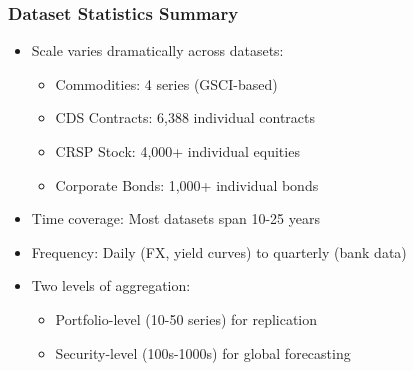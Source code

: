 \documentclass[ignorenonframetext, 9pt]{beamer}
\begin{document}
\begin{frame}
  \frametitle{Dataset Statistics Summary}
  \label{slide:dataset_stats}
\small
\begin{itemize}
\item \alert{Scale varies dramatically across datasets:}
\begin{itemize}
  \item Commodities: 4 series (GSCI-based)
  \item CDS Contracts: 6,388 individual contracts
  \item CRSP Stock: 4,000+ individual equities
  \item Corporate Bonds: 1,000+ individual bonds
\end{itemize}
\vspace{0.3cm}
\item \alert{Time coverage:} Most datasets span 10-25 years
\vspace{0.3cm}
\item \alert{Frequency:} Daily (FX, yield curves) to quarterly (bank data)
\vspace{0.3cm}
\item \alert{Two levels of aggregation:}
\begin{itemize}
  \item Portfolio-level (10-50 series) for replication
  \item Security-level (100s-1000s) for global forecasting
\end{itemize}
\end{itemize}
\end{frame}
\end{document}

